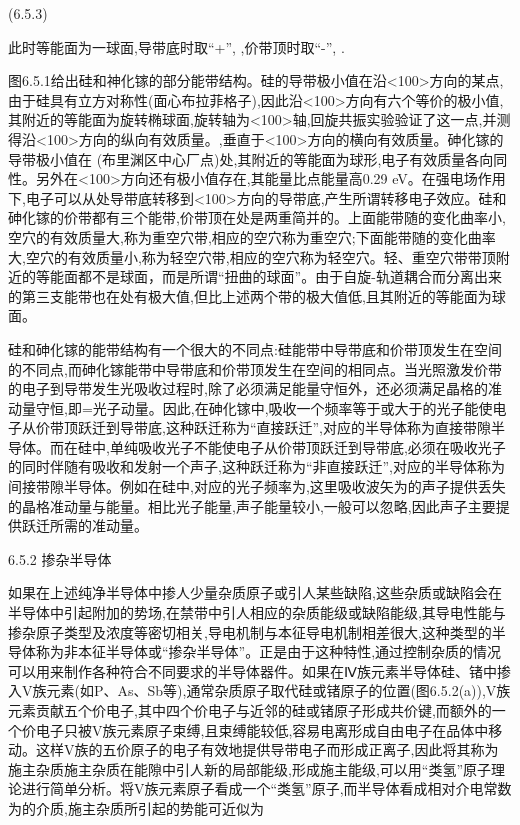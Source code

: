  	(6.5.3)

此时等能面为一球面,导带底时取“+”, ,价带顶时取“-”, .

图6.5.1给出硅和神化镓的部分能带结构。硅的导带极小值在沿<100>方向的某点,由于硅具有立方对称性(面心布拉菲格子),因此沿<100>方向有六个等价的极小值,其附近的等能面为旋转椭球面,旋转轴为<100>轴,回旋共振实验验证了这一点,并测得沿<100>方向的纵向有效质量。,垂直于<100>方向的横向有效质量。砷化镓的导带极小值在 (布里渊区中心厂点)处,其附近的等能面为球形,电子有效质量各向同性。另外在<100>方向还有极小值存在,其能量比点能量高0.29 eV。在强电场作用下,电子可以从处导带底转移到<100>方向的导带底,产生所谓转移电子效应。硅和砷化镓的价带都有三个能带,价带顶在处是两重简并的。上面能带随的变化曲率小,空穴的有效质量大,称为重空穴带,相应的空穴称为重空穴;下面能带随的变化曲率大,空穴的有效质量小,称为轻空穴带,相应的空穴称为轻空穴。轻、重空穴带带顶附近的等能面都不是球面，而是所谓“扭曲的球面”。由于自旋-轨道耦合而分离出来的第三支能带也在处有极大值,但比上述两个带的极大值低,且其附近的等能面为球面。

硅和砷化镓的能带结构有一个很大的不同点:硅能带中导带底和价带顶发生在空间的不同点,而砷化镓能带中导带底和价带顶发生在空间的相同点。当光照激发价带的电子到导带发生光吸收过程时,除了必须满足能量守恒外，还必须满足晶格的准动量守恒,即=光子动量。因此,在砷化镓中,吸收一个频率等于或大于的光子能使电子从价带顶跃迁到导带底,这种跃迁称为“直接跃迁”,对应的半导体称为直接带隙半导体。而在硅中,单纯吸收光子不能使电子从价带顶跃迁到导带底,必须在吸收光子的同时伴随有吸收和发射一个声子,这种跃迁称为“非直接跃迁”,对应的半导体称为间接带隙半导体。例如在硅中,对应的光子频率为,这里吸收波矢为的声子提供丢失的晶格准动量与能量。相比光子能量,声子能量较小,一般可以忽略,因此声子主要提供跃迁所需的准动量。



6.5.2 掺杂半导体

如果在上述纯净半导体中掺人少量杂质原子或引人某些缺陷,这些杂质或缺陷会在半导体中引起附加的势场,在禁带中引人相应的杂质能级或缺陷能级,其导电性能与掺杂原子类型及浓度等密切相关,导电机制与本征导电机制相差很大,这种类型的半导体称为非本征半导体或“掺杂半导体”。正是由于这种特性,通过控制杂质的情况可以用来制作各种符合不同要求的半导体器件。如果在Ⅳ族元素半导体硅、锗中掺入V族元素(如P、As、Sb等),通常杂质原子取代硅或锗原子的位置(图6.5.2(a)),V族元素贡献五个价电子,其中四个价电子与近邻的硅或锗原子形成共价键,而额外的一个价电子只被V族元素原子束缚,且束缚能较低,容易电离形成自由电子在品体中移动。这样V族的五价原子的电子有效地提供导带电子而形成正离子,因此将其称为施主杂质施主杂质在能隙中引人新的局部能级,形成施主能级,可以用“类氢”原子理论进行简单分析。将V族元素原子看成一个“类氢”原子,而半导体看成相对介电常数为的介质,施主杂质所引起的势能可近似为

